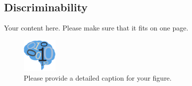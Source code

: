 \documentclass[simplex.tex]{subfiles}
\begin{document}
\subsection{Discriminability}
Your content here. Please make sure that it fits on one page.

\begin{figure}[!h]
\begin{cframed}
\centering
\includegraphics[width=0.15\textwidth]{neurodata_small.png}
\caption{Please provide a detailed caption for your figure.}
\label{fig:meda}
\end{cframed}
\end{figure}
%
%
%
\end{document}
